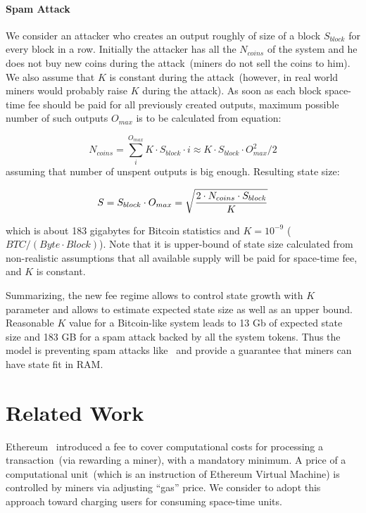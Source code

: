 \documentclass[]{llncs}   %
\newcommand{\state}{state}
\begin{document}
\paragraph{Spam Attack}

We consider an attacker who creates an output roughly of size of a block $S_{block}$ for every block in a row. Initially the attacker has all the $N_{coins}$ of the system and he does not buy new coins during the attack~(miners do not sell the coins to him). We also assume that $K$ is constant during the attack~(however, in real world miners would probably raise $K$ during the attack). As soon as each block space-time fee should be paid for all previously created outputs, maximum possible number of such outputs $O_{max}$ is to be calculated from equation:

\begin{equation}
N_{coins} = \sum_i^{O_{max}}{K \cdot S_{block} \cdot i} \approx K \cdot S_{block} \cdot O_{max}^2 / 2
\end{equation}
assuming that number of unspent outputs is big enough. Resulting state size: 

\begin{equation}
\label{eq:statesizemax}
S = S_{block} \cdot O_{max} = \sqrt { 2 \cdot N_{coins} \cdot S_{block} \over K}
\end{equation}

which is about 183 gigabytes for Bitcoin statistics and $K=10^{-9}$ ($BTC / (Byte \cdot Block)$). %
Note that it is upper-bound of \state{} size calculated from non-realistic assumptions that all available supply will be paid for space-time fee, and $K$ is constant.

Summarizing, the new fee regime allows to control state growth with $K$ parameter and allows to estimate expected state size as well as an upper bound. Reasonable $K$ value for a Bitcoin-like system leads to 13 Gb of expected state size and 183 GB for a spam attack backed by all the system tokens. Thus the model is preventing spam attacks like~\cite{bitcoin2015flood} and provide a guarantee that miners can have state fit in RAM.

\section{Related Work}
\label{sec:rel-work}

Ethereum~\cite{ethyp} introduced a fee to cover computational costs for processing a transaction~(via rewarding a miner), with a mandatory minimum. A price of a computational unit~(which is an instruction of Ethereum Virtual Machine) is controlled by miners via adjusting ``gas'' price. We consider to adopt this approach toward charging users for consuming space-time units.
\end{document}
